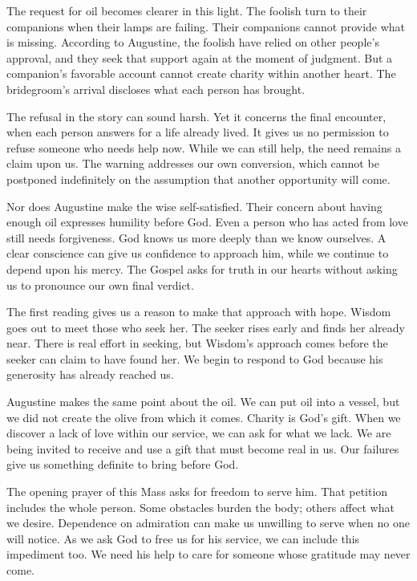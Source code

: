 The request for oil becomes clearer in this light. The foolish turn to their companions when their lamps are failing. Their companions cannot provide what is missing. According to Augustine, the foolish have relied on other people's approval, and they seek that support again at the moment of judgment. But a companion's favorable account cannot create charity within another heart. The bridegroom's arrival discloses what each person has brought.

The refusal in the story can sound harsh. Yet it concerns the final encounter, when each person answers for a life already lived. It gives us no permission to refuse someone who needs help now. While we can still help, the need remains a claim upon us. The warning addresses our own conversion, which cannot be postponed indefinitely on the assumption that another opportunity will come.

Nor does Augustine make the wise self-satisfied. Their concern about having enough oil expresses humility before God. Even a person who has acted from love still needs forgiveness. God knows us more deeply than we know ourselves. A clear conscience can give us confidence to approach him, while we continue to depend upon his mercy. The Gospel asks for truth in our hearts without asking us to pronounce our own final verdict.

The first reading gives us a reason to make that approach with hope. Wisdom goes out to meet those who seek her. The seeker rises early and finds her already near. There is real effort in seeking, but Wisdom's approach comes before the seeker can claim to have found her. We begin to respond to God because his generosity has already reached us.

Augustine makes the same point about the oil. We can put oil into a vessel, but we did not create the olive from which it comes. Charity is God's gift. When we discover a lack of love within our service, we can ask for what we lack. We are being invited to receive and use a gift that must become real in us. Our failures give us something definite to bring before God.

The opening prayer of this Mass asks for freedom to serve him. That petition includes the whole person. Some obstacles burden the body; others affect what we desire. Dependence on admiration can make us unwilling to serve when no one will notice. As we ask God to free us for his service, we can include this impediment too. We need his help to care for someone whose gratitude may never come.

